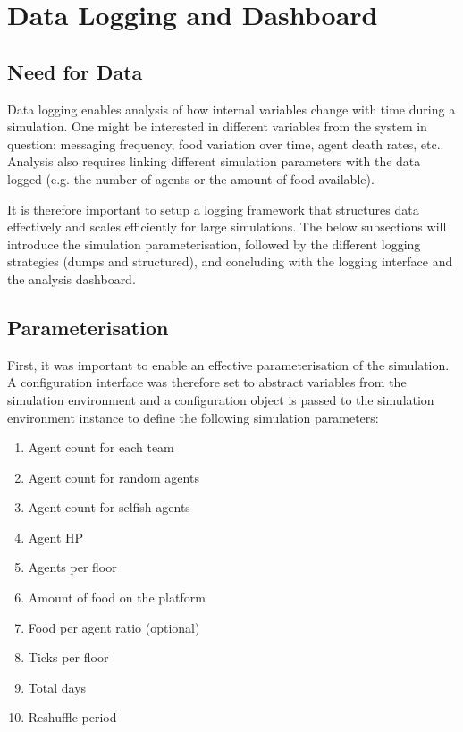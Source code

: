 \chapter{Data Logging and Dashboard}\label{data_logging}

\section{Need for Data}

Data logging enables analysis of how internal variables change with time during a simulation. One might be interested in different variables from the system in question: messaging frequency, food variation over time, agent death rates, etc.. Analysis also requires linking different simulation parameters with the data logged (e.g. the number of agents or the amount of food available). 

It is therefore important to setup a logging framework that structures data effectively and scales efficiently for large simulations. The below subsections will introduce the simulation parameterisation, followed by the different logging strategies (dumps and structured), and concluding with the logging interface and the analysis dashboard.

\section{Parameterisation}

First, it was important to enable an effective parameterisation of the simulation. A configuration interface was therefore set to abstract variables from the simulation environment and a configuration object is passed to the simulation environment instance to define the following simulation parameters:

\begin{multicols}{2}
    \begin{enumerate}
        \item Agent count for each team
        \item Agent count for random agents
        \item Agent count for selfish agents
        \item Agent HP
        \item Agents per floor
        \item Amount of food on the platform
        \item Food per agent ratio (optional)
        \item Ticks per floor
        \item Total days
        \item Reshuffle period
    \end{enumerate}
\end{multicols}

